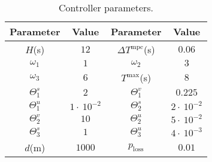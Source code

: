 		
		\begin{center}
			\begin{table}[h!]
				\centering
				\begin{tabular}[t!]{ |c|c|c|c| } 
					\hline
					\textbf{Parameter} & \textbf{Value} & \textbf{Parameter} & \textbf{Value}  \\
					\hline
					$H$(\unit{\second})	& $12$ & $\Delta T^{\mathrm{mpc}}$(\unit{\second}) & $0.06$  \\ 
					$\omega_1$	& $1$ & $\omega_2$ & $3$ \\ 
					$\omega_3$	& $6$ & $T^{\max}$(\unit{\second}) & $8$ \\ 
					$\Theta^s_1$	& $2$ & $\Theta^v_1$ & $0.225$ \\
					$\Theta^u_1$	& $1 \cdot\ {10}^{-2}$ & $\Theta^s_2$ & $2 \cdot\ {10}^{-2}$ \\
					$\Theta^v_2$	& $10$ & $\Theta^u_2$ & $5 \cdot\ {10}^{-2}$ \\
					$\Theta^s_3$	& $1$ & $\Theta^u_3$ & $ 4 \cdot\ {10}^{-3}$ \\
					$d$(\unit{\meter})	& $1000$ & $p_\mathrm{loss}$
					&  $0.01$\\
					\hline
				\end{tabular}
				\caption{Controller parameters.}
				\label{table:controllerParameters}
			\end{table}
		\end{center}
		
